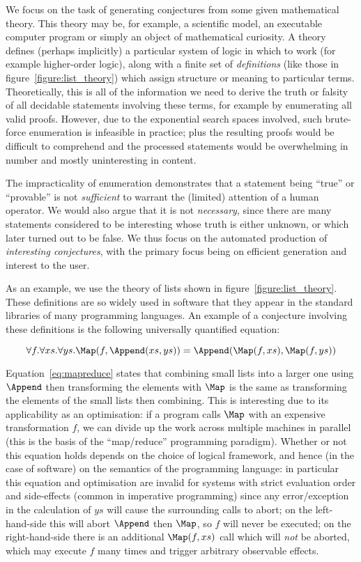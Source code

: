 We focus on the task of generating conjectures from some given mathematical
theory. This theory may be, for example, a scientific model, an executable
computer program or simply an object of mathematical curiosity. A theory
defines (perhaps implicitly) a particular system of logic in which to work (for
example higher-order logic), along with a finite set of \emph{definitions} (like
those in figure~\ref{figure:list_theory}) which assign structure or meaning to
particular terms. Theoretically, this is all of the information we need to
derive the truth or falsity of all decidable statements involving these terms,
for example by enumerating all valid proofs. However, due to the exponential
search spaces involved, such brute-force enumeration is infeasible in practice;
plus the resulting proofs would be difficult to comprehend and the processed
statements would be overwhelming in number and mostly uninteresting in content.

The impracticality of enumeration demonstrates that a statement being ``true''
or ``provable'' is not \emph{sufficient} to warrant the (limited) attention of a
human operator. We would also argue that it is not \emph{necessary}, since there
are many statements considered to be interesting whose truth is either unknown,
or which later turned out to be false. We thus focus on the automated production
of \emph{interesting conjectures}, with the primary focus being on efficient
generation and interest to the user.

As an example, we use the theory of lists shown in
figure~\ref{figure:list_theory}. These definitions are so widely used in
software that they appear in the standard libraries of many programming
languages. An example of a conjecture involving these definitions is the
following universally quantified equation:

\begin{equation} \label{eq:mapreduce}
  \forall f. \forall xs. \forall ys.
    \Map(f, \Append(xs, ys)) = \Append(\Map(f, xs), \Map(f, ys))
\end{equation}

Equation~\ref{eq:mapreduce} states that combining small lists into a larger one
using $\Append$ then transforming the elements with $\Map$ is the same as
transforming the elements of the small lists then combining. This is interesting
due to its applicability as an optimisation: if a program calls $\Map$ with an
expensive transformation $f$, we can divide up the work across multiple machines
in parallel (this is the basis of the ``map/reduce'' programming paradigm).
Whether or not this equation holds depends on the choice of logical framework,
and hence (in the case of software) on the semantics of the programming
language: in particular this equation and optimisation are invalid for systems
with strict evaluation order and side-effects (common in imperative programming)
since any error/exception in the calculation of $ys$ will cause the surrounding
calls to abort; on the left-hand-side this will abort $\Append$ then $\Map$, so
$f$ will never be executed; on the right-hand-side there is an additional
$\Map(f, xs)$ call which will \emph{not} be aborted, which may execute $f$ many
times and trigger arbitrary observable effects.

